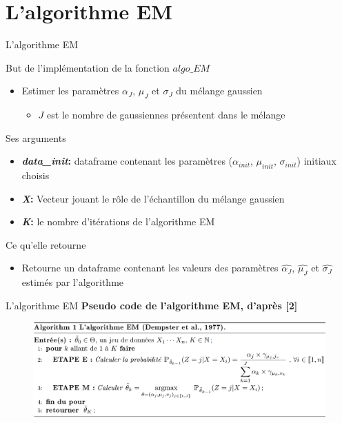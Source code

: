 \documentclass[11pt]{beamer}
\begin{document}
	\section{L'algorithme EM}
	\begin{frame}{L'algorithme EM}
		\begin{block}{\scriptsize But de l'implémentation de la fonction $algo\_EM$}
			\begin{itemize}
				\scriptsize
				\item Estimer les paramètres $\alpha_J$, $\mu_J$ et $\sigma_J$ du mélange gaussien
				\begin{itemize}
					\scriptsize
					\item $J$ est le nombre de gaussiennes présentent dans le mélange
				\end{itemize}
			\end{itemize}
		\end{block}
		\begin{block}{ \scriptsize Ses arguments}
			\begin{itemize}
				\scriptsize
				\item \textbf{\textit{data\_init}:} dataframe contenant les paramètres ($\alpha_{init}$, $\mu_{init}$, $\sigma_{init}$) initiaux choisis \\
				\item \textbf{\textit{X}:} Vecteur jouant le rôle de l'échantillon du mélange gaussien  \\
				\item \textbf{\textit{K}:} le nombre d'itérations de l'algorithme EM
			\end{itemize}
		\end{block}
		\begin{block}{\scriptsize Ce qu'elle retourne}
			\scriptsize
			\begin{itemize}
				\item Retourne un dataframe contenant les valeurs des paramètres $\widehat{\alpha_J}$, $\widehat{\mu_J}$ et $\widehat{\sigma_J}$ estimés par l'algorithme
			\end{itemize}
		\end{block}
	\end{frame}
	\begin{frame}{L'algorithme EM}
		\textbf{Pseudo code de l'algorithme EM, d'après [2]}
		\begin{figure}[H]
			\centering
			\includegraphics[scale=0.6]{images/pseudo_code.png}
		\end{figure}
	\end{frame}
\end{document}
